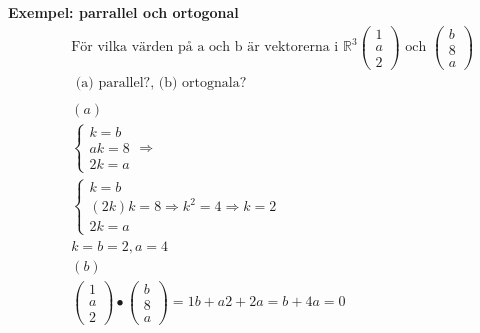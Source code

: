 \textbf{Exempel: parrallel och ortogonal}
\begin{align*}
  &\quad  \text{För vilka värden på a och b är vektorerna i } \mathbb{R}^3
  \begin{pmatrix}  1 \\  a \\  2  \end{pmatrix} \text{ och }
  \begin{pmatrix}  b \\  8 \\  a  \end{pmatrix} \\
  &\quad  \text{ (a) parallel?, (b) ortognala?}  \\
  &\quad  \\
  &\quad  (a) \\
  &\quad
  \left\{\begin{array}{r}
  k = b \\
  ak = 8 \\
  2k = a
  \end{array}\right.  \Rightarrow{} \\
  &\quad
  \left\{\begin{array}{r}
  k = b \\
  (2k)k = 8  \Rightarrow{} k^2 = 4  \Rightarrow{} k = 2  \\ 
  2k = a
  \end{array}\right. \\
  &\quad  k=b=2, a=4 \\
  &\quad (b) \\
  &\quad
  \begin{pmatrix}  1 \\  a \\  2  \end{pmatrix} \bullet{}
  \begin{pmatrix}  b \\  8 \\  a  \end{pmatrix} = 1b+a2+2a = b+4a = 0 \\
\end{align*}


